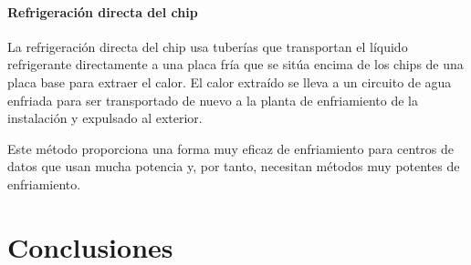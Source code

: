 \subsubsection{Refrigeración directa del chip}

La refrigeración directa del chip usa tuberías que transportan el líquido refrigerante directamente a una placa fría que se sitúa encima de los chips de una placa base para extraer el calor. El calor extraído se lleva a un circuito de agua enfriada para ser transportado de nuevo a la planta de enfriamiento de la instalación  y expulsado al exterior.

Este método proporciona una forma muy eficaz de enfriamiento para centros de datos que usan mucha potencia y, por tanto, necesitan métodos muy potentes de enfriamiento.

\chapter{Conclusiones}














